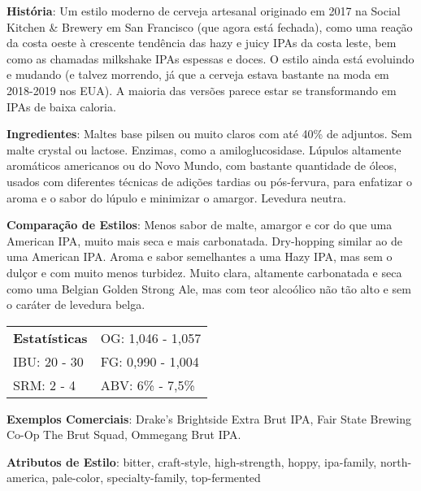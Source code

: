 \textbf{História}: Um estilo moderno de cerveja artesanal originado em 2017 na Social Kitchen \& Brewery em San Francisco (que agora está fechada), como uma reação da costa oeste à crescente tendência das hazy e juicy IPAs da costa leste, bem como as chamadas milkshake IPAs espessas e doces. O estilo ainda está evoluindo e mudando (e talvez morrendo, já que a cerveja estava bastante na moda em 2018-2019 nos EUA). A maioria das versões parece estar se transformando em IPAs de baixa caloria.

\textbf{Ingredientes}: Maltes base pilsen ou muito claros com até 40\% de adjuntos. Sem malte crystal ou lactose. Enzimas, como a amiloglucosidase. Lúpulos altamente aromáticos americanos ou do Novo Mundo, com bastante quantidade de óleos, usados com diferentes técnicas de adições tardias ou pós-fervura, para enfatizar o aroma e o sabor do lúpulo e minimizar o amargor. Levedura neutra.

\textbf{Comparação de Estilos}: Menos sabor de malte, amargor e cor do que uma American IPA, muito mais seca e mais carbonatada. Dry-hopping similar ao de uma American IPA. Aroma e sabor semelhantes a uma Hazy IPA, mas sem o dulçor e com muito menos turbidez. Muito clara, altamente carbonatada e seca como uma Belgian Golden Strong Ale, mas com teor alcoólico não tão alto e sem o caráter de levedura belga.

\begin{tabular}{@{}p{35mm}p{35mm}@{}}
  \textbf{Estatísticas} & OG: 1,046 - 1,057 \\
  IBU: 20 - 30  & FG: 0,990 - 1,004 \\
  SRM: 2 - 4  & ABV: 6\% - 7,5\%
\end{tabular}

\textbf{Exemplos Comerciais}: Drake's Brightside Extra Brut IPA, Fair State Brewing Co-Op The Brut Squad, Ommegang Brut IPA.

\textbf{Atributos de Estilo}: bitter, craft-style, high-strength, hoppy, ipa-family, north-america, pale-color, specialty-family, top-fermented
